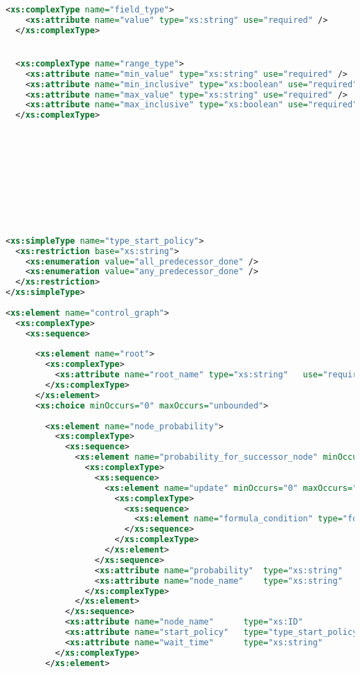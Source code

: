 \begin{lstlisting}[style=stylexml,language=XML]
  <xs:complexType name="field_type">
    <xs:attribute name="value" type="xs:string" use="required" />
  </xs:complexType>


  <xs:complexType name="range_type">
    <xs:attribute name="min_value" type="xs:string" use="required" />
    <xs:attribute name="min_inclusive" type="xs:boolean" use="required" />
    <xs:attribute name="max_value" type="xs:string" use="required" />
    <xs:attribute name="max_inclusive" type="xs:boolean" use="required" />
  </xs:complexType>










<xs:simpleType name="type_start_policy">
  <xs:restriction base="xs:string">
    <xs:enumeration value="all_predecessor_done" />
    <xs:enumeration value="any_predecessor_done" />
  </xs:restriction>
</xs:simpleType>
  
<xs:element name="control_graph">
  <xs:complexType>
    <xs:sequence>
      
      <xs:element name="root">
        <xs:complexType>
          <xs:attribute name="root_name" type="xs:string"   use="required"/>
        </xs:complexType>
      </xs:element>
      <xs:choice minOccurs="0" maxOccurs="unbounded">
        
        <xs:element name="node_probability">
          <xs:complexType>
            <xs:sequence>
              <xs:element name="probability_for_successor_node" minOccurs="0" maxOccurs="unbounded">
                <xs:complexType>
                  <xs:sequence>
                    <xs:element name="update" minOccurs="0" maxOccurs="unbounded">
                      <xs:complexType>
                        <xs:sequence>
                          <xs:element name="formula_condition" type="formula_condition_type" minOccurs="1" maxOccurs="1" />
                        </xs:sequence>
                      </xs:complexType>
                    </xs:element>
                  </xs:sequence>
                  <xs:attribute name="probability"  type="xs:string"   use="required"/>
                  <xs:attribute name="node_name"    type="xs:string"   use="required"/>
                </xs:complexType>
              </xs:element>
            </xs:sequence>
            <xs:attribute name="node_name"      type="xs:ID"                use="required"/>
            <xs:attribute name="start_policy"   type="type_start_policy"    use="required"/>
            <xs:attribute name="wait_time"      type="xs:string"            use="optional"/>
          </xs:complexType>
        </xs:element>
                

\end{lstlisting}
